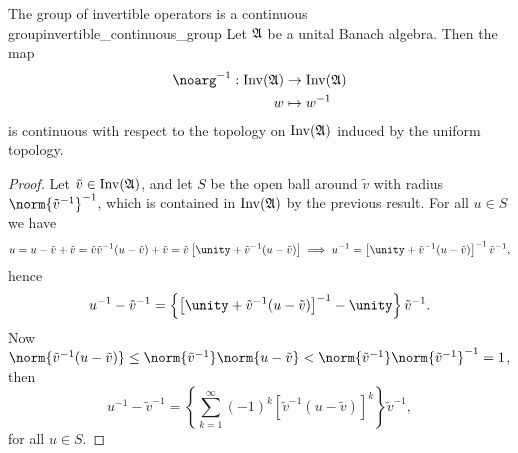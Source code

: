\begin{proposition}{The group of invertible operators is a continuous group}{invertible_continuous_group}
    Let \(\mathfrak{A}\) be a unital Banach algebra. Then the map
    \begin{align*}
        \noarg^{-1} : \invertible{\algebra{A}} &\to \invertible{\algebra{A}}\\
                                             w &\mapsto w^{-1}
    \end{align*}
    is continuous with respect to the topology on \(\operatorname{Inv}(\mathfrak{A})\) induced by the uniform topology.
\end{proposition}
\begin{proof}
    Let \(\tilde{v} \in \operatorname{Inv}(\mathfrak{A})\), and let \(S\) be the open ball around \(\tilde{v}\) with radius \(\norm{\tilde{v}^{-1}}^{-1}\), which is contained in \(\operatorname{Inv}(\mathfrak{A})\) by the previous result. For all \(u \in S\) we have
    \begin{equation*}
        u = u - \tilde{v} + \tilde{v} = \tilde{v}\tilde{v}^{-1}(u - \tilde{v}) + \tilde{v} = \tilde{v}\left[\unity + \tilde{v}^{-1}(u -\tilde{v})\right] \implies u^{-1} = \left[\unity + \tilde{v}^{-1}(u -\tilde{v})\right]^{-1} \tilde{v}^{-1},
    \end{equation*}
    hence
    \begin{equation*}
        u^{-1} - \tilde{v}^{-1} = \left\{\left[\unity + \tilde{v}^{-1}(u -\tilde{v})\right]^{-1} - \unity\right\}\tilde{v}^{-1}.
    \end{equation*}
    Now \(\norm{\tilde{v}^{-1}(u - \tilde{v})} \leq \norm{\tilde{v}^{-1}}\norm{u-\tilde{v}} < \norm{\tilde{v}^{-1}}\norm{\tilde{v}^{-1}}^{-1} = 1\), then
    \begin{equation*}
        u^{-1} - \tilde{v}^{-1} = \left\{\sum_{k=1}^\infty (-1)^k \left[\tilde{v}^{-1}(u-\tilde{v})\right]^k \right\}\tilde{v}^{-1},
    \end{equation*}
    for all \(u \in S\).


\end{proof}
